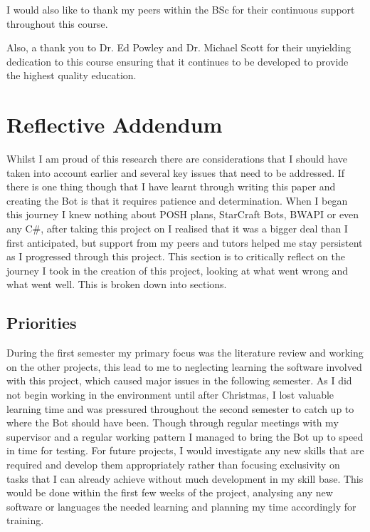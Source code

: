 \documentclass[journal]{IEEEtran}
\begin{document}
	I would also like to thank my peers within the BSc for their continuous support throughout this course.
	
	Also, a thank you to Dr. Ed Powley and Dr. Michael Scott for their unyielding dedication to this course ensuring that it continues to be developed to provide the highest quality education.
	
	\section{Reflective Addendum}
	Whilst I am proud of this research there are considerations that I should have taken into account earlier and several key issues that need to be addressed. If there is one thing though that I have learnt through writing this paper and creating the Bot is that it requires patience and determination. When I began this journey I knew nothing about POSH plans, StarCraft Bots, BWAPI or even any C\#, after taking this project on I realised that it was a bigger deal than I first anticipated, but support from my peers and tutors helped me stay persistent as I progressed through this project. This section is to critically reflect on the journey I took in the creation of this project, looking at what went wrong and what went well. This is broken down into sections.
	
	\subsection{Priorities}
	During the first semester my primary focus was the literature review and working on the other projects, this lead to me to neglecting learning the software involved with this project, which caused major issues in the following semester. As I did not begin working in the environment until after Christmas, I lost valuable learning time and was pressured throughout the second semester to catch up to where the Bot should have been. Though through regular meetings with my supervisor and a regular working pattern I managed to bring the Bot up to speed in time for testing. For future projects, I would investigate any new skills that are required and develop them appropriately rather than focusing exclusivity on tasks that I can already achieve without much development in my skill base. This would be done within the first few weeks of the project, analysing any new software or languages the needed learning and planning my time accordingly for training.
	
\end{document}
